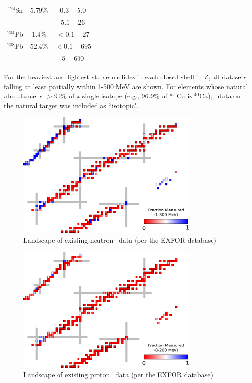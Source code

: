\begin{table}[ht]
\begin{center}
\begin{tabular}{ c c c c }
            $^{124}$Sn & $5.79\%$ & $0.3-5.0$ & \cite{Harper1982}\\
            & & $5.1-26$ & \cite{Rapaport1980}\\

            $^{204}$Pb & $1.4\%$ & $<0.1-27$ & \cite{Carlton2003}\\

            $^{208}$Pb & $52.4\%$ & $<0.1 - 695$ & \cite{Harvey1999}\\
            & & $5-600$ & \cite{Finlay1993}\\

            \hline
        \end{tabular}
    \end{center}
\end{table}

 For the
    heaviest and lightest stable nuclides in each closed shell in Z, all
    datasets falling at least partially within 1-500 MeV are shown. For elements
    whose natural abundance is $>$90\% of a single isotope (e.g.,
    96.9\% of $^{\text{nat}}$Ca is $^{40}$Ca), \tot\ data on the natural
    target was included as ``isotopic".

\begin{figure}
    \includegraphics[width=0.8\textwidth]{figures/TCSChart.png}
    \caption{Landscape of existing neutron \tot\ data (per the EXFOR database)}
    \label{TCSChart}
\end{figure}

\begin{figure}
    \includegraphics[width=0.8\textwidth]{figures/RCSChart.png}
    \caption{Landscape of existing proton \rxn\ data (per the EXFOR database)}
    \label{RCSChart}
\end{figure}

